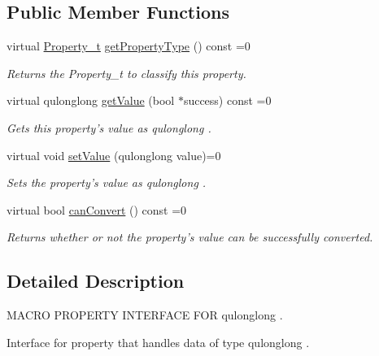 \subsection*{Public Member Functions}
\begin{DoxyCompactItemize}
\item 
virtual \hyperlink{group___property_classes_ga38f1ccddda12c7cb50b868c9f789ee37}{Property\-\_\-t} \hyperlink{class_i_u_long_long_property_a1fbaf297c80e2f5bf1cfa5d2f2b780ac}{get\-Property\-Type} () const =0
\begin{DoxyCompactList}\small\item\em Returns the Property\-\_\-t to classify this property. \end{DoxyCompactList}\item 
virtual qulonglong \hyperlink{class_i_u_long_long_property_acddc945a90cac8fa5921a9be25aaed13}{get\-Value} (bool $\ast$success) const =0
\begin{DoxyCompactList}\small\item\em Gets this property's value as qulonglong . \end{DoxyCompactList}\item 
virtual void \hyperlink{class_i_u_long_long_property_a59001a53d5cfdc3933038398fbeca269}{set\-Value} (qulonglong value)=0
\begin{DoxyCompactList}\small\item\em Sets the property's value as qulonglong . \end{DoxyCompactList}\item 
virtual bool \hyperlink{class_i_u_long_long_property_a905e766d258ebf63ed683a32aa2427a0}{can\-Convert} () const =0
\begin{DoxyCompactList}\small\item\em Returns whether or not the property's value can be successfully converted. \end{DoxyCompactList}\end{DoxyCompactItemize}


\subsection{Detailed Description}
M\-A\-C\-R\-O P\-R\-O\-P\-E\-R\-T\-Y I\-N\-T\-E\-R\-F\-A\-C\-E F\-O\-R qulonglong . 

Interface for property that handles data of type qulonglong . 

